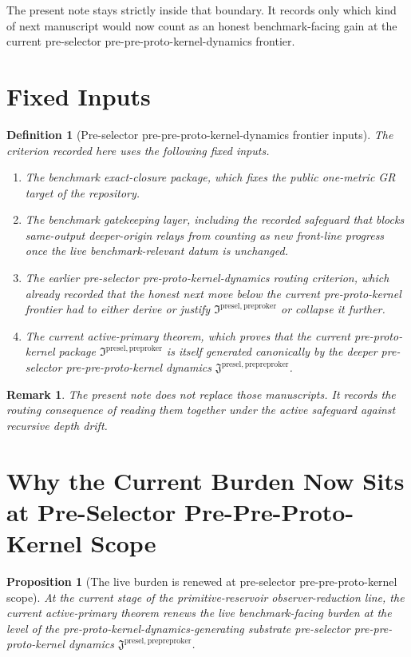 \documentclass[11pt]{article}
\newcommand{\PrePreProtoKernelPackage}{\mathfrak J^{\mathrm{presel,prepreproker}}}
\newcommand{\PreProtoKernelPackage}{\mathfrak I^{\mathrm{presel,preproker}}}
\newtheorem{definition}{Definition}
\newtheorem{proposition}{Proposition}
\newtheorem{remark}{Remark}
\begin{document}
The present note stays strictly inside that boundary. It records only which kind of next manuscript would now count as an honest benchmark-facing gain at the current pre-selector pre-pre-proto-kernel-dynamics frontier.

\section{Fixed Inputs}

\begin{definition}[Pre-selector pre-pre-proto-kernel-dynamics frontier inputs]
The criterion recorded here uses the following fixed inputs.
\begin{enumerate}
    \item The benchmark exact-closure package, which fixes the public one-metric GR target of the repository.
    \item The benchmark gatekeeping layer, including the recorded safeguard that blocks same-output deeper-origin relays from counting as new front-line progress once the live benchmark-relevant datum is unchanged.
    \item The earlier pre-selector pre-proto-kernel-dynamics routing criterion, which already recorded that the honest next move below the current pre-proto-kernel frontier had to either derive or justify \(\PreProtoKernelPackage\) or collapse it further.
    \item The current active-primary theorem, which proves that the current pre-proto-kernel package \(\PreProtoKernelPackage\) is itself generated canonically by the deeper pre-selector pre-pre-proto-kernel dynamics \(\PrePreProtoKernelPackage\).
\end{enumerate}
\end{definition}

\begin{remark}
The present note does not replace those manuscripts. It records the routing consequence of reading them together under the active safeguard against recursive depth drift.
\end{remark}

\section{Why the Current Burden Now Sits at Pre-Selector Pre-Pre-Proto-Kernel Scope}

\begin{proposition}[The live burden is renewed at pre-selector pre-pre-proto-kernel scope]
At the current stage of the primitive-reservoir observer-reduction line, the current active-primary theorem renews the live benchmark-facing burden at the level of the pre-proto-kernel-dynamics-generating substrate pre-selector pre-pre-proto-kernel dynamics \(\PrePreProtoKernelPackage\).
\end{proposition}
\end{document}
